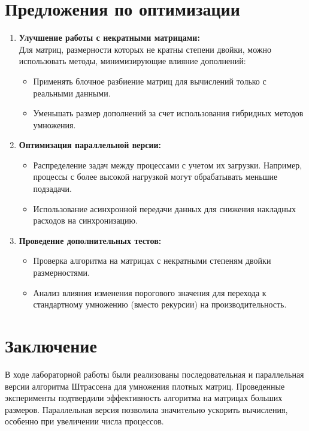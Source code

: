 \documentclass[a4paper, 14pt]{extarticle}
\begin{document}
    \newpage
    \section{Предложения по оптимизации}
\begin{enumerate}
\item \textbf{Улучшение работы с некратными матрицами:}  \\
   Для матриц, размерности которых не кратны степени двойки, можно использовать методы, минимизирующие влияние дополнений:
   \begin{itemize}
       \item Применять блочное разбиение матриц для вычислений только с реальными данными.
       \item Уменьшать размер дополнений за счет использования гибридных методов умножения.
   \end{itemize}

\item \textbf{Оптимизация параллельной версии: } 
   \begin{itemize}
       \item Распределение задач между процессами с учетом их загрузки. Например, процессы с более высокой нагрузкой могут обрабатывать меньшие подзадачи.
       \item Использование асинхронной передачи данных для снижения накладных расходов на синхронизацию.
   \end{itemize}

\item \textbf{Проведение дополнительных тестов:} 
   \begin{itemize}
       \item Проверка алгоритма на матрицах с некратными степеням двойки размерностями.
       \item Анализ влияния изменения порогового значения для перехода к стандартному умножению (вместо рекурсии) на производительность.
   \end{itemize}
\end{enumerate}



    \newpage
    \section{Заключение}
В ходе лабораторной работы были реализованы последовательная и параллельная версии алгоритма Штрассена для умножения плотных матриц. Проведенные эксперименты подтвердили эффективность алгоритма на матрицах больших размеров. Параллельная версия позволила значительно ускорить вычисления, особенно при увеличении числа процессов.  
\end{document}
